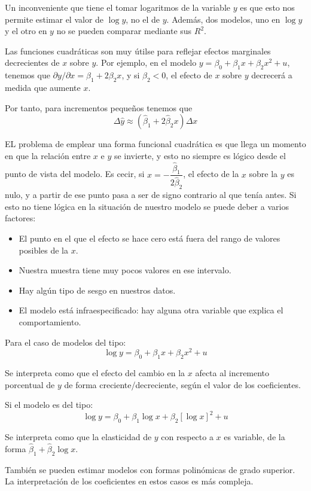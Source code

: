 Un inconveniente que tiene el tomar logaritmos de la variable $y$ es que esto nos permite estimar el valor de $\log y$, no el de $y$. Adem\'as, dos modelos, uno en $\log y$ y el otro en $y$ no se pueden comparar mediante sus $R^2$.


Las funciones cuadr\'aticas son muy \'utilse para reflejar efectos marginales decrecientes de $x$ sobre $y$. Por ejemplo, en el modelo $y=\beta_0+\beta_1x+\beta_2x^2+u$, tenemos que $\partial y/\partial x=\beta_1+2\beta_2x$, y si $\beta_2<0$, el efecto de $x$ sobre $y$ decrecer\'a a medida que aumente $x$.

Por tanto, para incrementos peque\~nos tenemos que 
\[\Delta\hat{y}\approx(\hat{\beta}_1+2\hat{\beta}_2x)\Delta x\]

EL problema de emplear una forma funcional cuadr\'atica es que llega un momento en que la relaci\'on entre $x$ e $y$ se invierte, y esto no siempre es l\'ogico desde el punto de vista del modelo. Es cecir, si $x=-\dfrac{\hat{\beta}_1}{2\hat{\beta}_2}$, el efecto de la $x$ sobre la $y$ es nulo, y a partir de ese punto pasa a ser de signo contrario al que ten\'ia antes. Si esto no tiene l\'ogica en la situaci\'on de nuestro modelo se puede deber a varios factores:
\begin{itemize}
\item El punto en el que el efecto se hace cero est\'a fuera del rango de valores posibles de la $x$.
\item Nuestra muestra tiene muy pocos valores en ese intervalo.
\item Hay alg\'un tipo de sesgo en nuestros datos.
\item El modelo est\'a infraespecificado: hay alguna otra variable que explica el comportamiento.
\end{itemize}


Para el caso de modelos del tipo:
\[\log{y}=\beta_0+\beta_1x+\beta_2x^2+u\]

Se interpreta como que el efecto del cambio en la $x$ afecta al incremento porcentual de $y$ de forma creciente/decreciente, seg\'un el valor de los coeficientes.

Si el modelo es del tipo:
\[\log{y}=\beta_0+\beta_1\log{x}+\beta_2[\log{x}]^2+u\]

Se interpreta como que la elasticidad de $y$ con respecto a $x$ es variable, de la forma $\hat{\beta}_1+\hat{\beta}_2\log{x}$.

Tambi\'en se pueden estimar modelos con formas polin\'omicas de grado superior. La interpretaci\'on de los coeficientes en estos casos es m\'as compleja.

